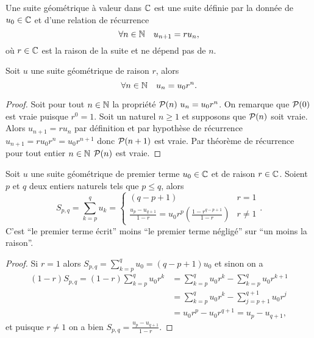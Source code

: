 \begin{defdef}
  Une suite géométrique à valeur dans $\C$ est une suite définie par la donnée de $u_0\in\C$ et d'une relation de récurrence
  \begin{equation}
    \forall n \in \N \quad u_{n+1}=ru_n,
  \end{equation}
  où $r\in\C$ est la raison de la suite et ne dépend pas de $n$.
\end{defdef}
\begin{prop}
  Soit $u$ une suite géométrique de raison $r$, alors
  \begin{equation}
    \forall n \in \N \quad u_n=u_0r^n.
  \end{equation}
\end{prop}
\begin{proof}
  Soit pour tout $n\in\N$ la propriété $\P(n)\ u_n=u_0r^n$. On remarque que $\P(0)$ est vraie puisque $r^0=1$. Soit un naturel $n\geq 1$ et supposons que $\P(n)$ soit vraie. Alors $u_{n+1}=r u_n$ par définition et par hypothèse de récurrence $u_{n+1}=r u_0 r^n=u_0 r^{n+1}$ donc $\P(n+1)$ est vraie. Par théorème de récurrence pour tout entier $n\in\N$ $\P(n)$ est vraie.
\end{proof}
\begin{prop}
  Soit $u$ une suite géométrique de premier terme $u_0\in\C$ et de raison $r\in\C$. Soient $p$ et $q$ deux entiers naturels tels que $p\leq q$, alors
  \begin{equation}
    S_{p,q}=\sum_{k=p}^q u_k=
    \begin{cases}
      (q-p+1) & r=1 \\
      \frac{u_p-u_{q+1}}{1-r}=u_0r^p\left(\frac{1-r^{q-p+1}}{1-r}\right) & r \neq 1
    \end{cases}.
  \end{equation}
  C'est ``le premier terme écrit'' moins ``le premier terme négligé'' sur ``un moins la raison''.
\end{prop}
\begin{proof}
  Si $r=1$ alors $S_{p,q}=\sum_{k=p}^qu_0=(q-p+1)u_0$ et sinon on a
  \begin{align}
    (1-r)S_{p,q}=(1-r)\sum_{k=p}^q u_0r^k &= \sum_{k=p}^q u_0r^k - \sum_{k=p}^q u_0r^{k+1}\\
&=\sum_{k=p}^q u_0r^k - \sum_{j=p+1}^{q+1} u_0r^{j}\\
&=u_0 r^p -u_0 r^{q+1} = u_p-u_{q+1},
  \end{align}
et puisque $r\neq 1$ on a bien  $S_{p,q}=\frac{u_p-u_{q+1}}{1-r}$.
\end{proof}
